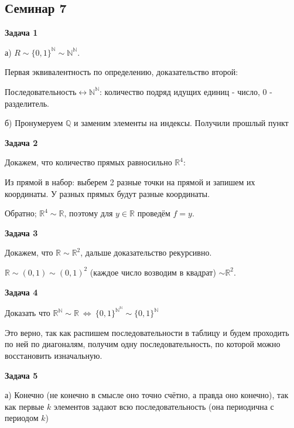 \subsection{Семинар 7}
\begin{center}
\textbf{Задача 1}
\end{center}
а) $\displaystyle R\sim \{0,1\}^{\mathbb{N}} \sim \mathbb{N}^{\mathbb{N}}$.

Первая эквивалентность по определению, доказательство второй:

Последовательность$\displaystyle \leftrightarrow $$\displaystyle \mathbb{N}^{\mathbb{N}}$: количество подряд идущих единиц - число, $\displaystyle 0$ - разделитель.



б) Пронумеруем $\displaystyle \mathbb{Q}$ и заменим элементы на индексы. Получили прошлый пункт

\begin{center}
\textbf{Задача 2}
\end{center}
Докажем, что количество прямых равносильно $\displaystyle \mathbb{R}^{4}$:

Из прямой в набор: выберем 2 разные точки на прямой и запишем их координаты. У разных прямых будут разные координаты.

Обратно; $\displaystyle \mathbb{R}^{4} \sim \mathbb{R}$, поэтому для $\displaystyle y\in \mathbb{R}$ проведём $\displaystyle f=y$.

\begin{center}
\textbf{Задача 3}
\end{center}
Докажем, что $\displaystyle \mathbb{R} \sim \mathbb{R}^{2}$, дальше доказательство рекурсивно.

$\displaystyle \mathbb{R} \sim ( 0,1) \sim ( 0,1)^{2}$ (каждое число возводим в квадрат) $\displaystyle \sim \mathbb{R}^{2}$.

\begin{center}
\textbf{Задача 4}
\end{center}
Доказать что $\displaystyle \mathbb{R}^{\mathbb{N}} \sim \mathbb{R} \ \Leftrightarrow \ \{0,1\}^{\mathbb{N}^{\mathbb{N}}} \sim \{0,1\}^{\mathbb{N}}$

Это верно, так как распишем последовательности в таблицу и будем проходить по ней по диагоналям, получим одну последовательность, по которой можно восстановить изначальную.

\begin{center}
\textbf{Задача 5}
\end{center}
а) Конечно (не конечно в смысле оно точно счётно, а правда оно конечно), так как первые $\displaystyle k$ элементов задают всю последовательность (она периодична с периодом $\displaystyle k$)


